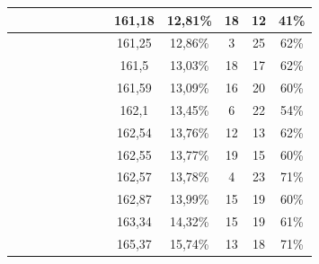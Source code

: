 \begin{center}
\begin{longtable}{|c|c|c|c|c|c|c|c|c|c|c|c|c|}
 \x &  &  &  &  &  &  \x &  \x & 161,18 & 12,81\% & 18 & 12 & 41\% \\ \hline
 \x &  &  \x &  &  &  &  \x &  \x & 161,25 & 12,86\% & 3 & 25 & 62\% \\ \hline
 \x &  &  \x &  \x &  \x &  &  &  \x & 161,5 & 13,03\% & 18 & 17 & 62\% \\ \hline
 \x &  &  &  &  \x &  &  \x &  \x & 161,59 & 13,09\% & 16 & 20 & 60\% \\ \hline
 \x &  \x &  &  \x &  &  &  \x &  \x & 162,1 & 13,45\% & 6 & 22 & 54\% \\ \hline
 \x &  &  \x &  &  \x &  &  \x &  \x & 162,54 & 13,76\% & 12 & 13 & 62\% \\ \hline
 \x &  \x &  &  \x &  \x &  &  &  \x & 162,55 & 13,77\% & 19 & 15 & 60\% \\ \hline
 \x &  &  &  \x &  &  \x &  \x &  \x & 162,57 & 13,78\% & 4 & 23 & 71\% \\ \hline
 \x &  &  &  \x &  \x &  &  &  \x & 162,87 & 13,99\% & 15 & 19 & 60\% \\ \hline
 \x &  &  &  \x &  \x &  &  \x &  \x & 163,34 & 14,32\% & 15 & 19 & 61\% \\ \hline
 \x &  &  \x &  \x &  \x &  \x &  &  \x & 165,37 & 15,74\% & 13 & 18 & 71\% \\ \hline
\end{longtable}
\label{table:windProdInputParamsSeasonal}
\end{center}
\normalsize


